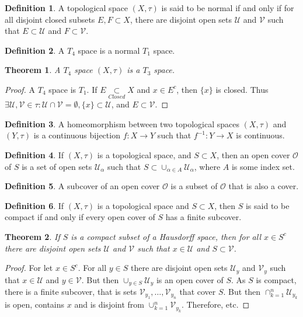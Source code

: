 \documentclass[oneside]{book}
\newtheorem{theorem}{Theorem}[section]
\theoremstyle{definition}
\newtheorem{definition}{Definition}[section]
\begin{document}
\begin{definition}
A topological space $(X,\tau)$ is said to be normal if and only if for all disjoint closed subsets $E,F\subset X$, there are disjoint open sets $\mathcal{U}$ and $\mathcal{V}$ such that $E\subset \mathcal{U}$ and $F\subset \mathcal{V}$.
\end{definition}

\begin{definition}
A $T_4$ space is a normal $T_1$ space.
\end{definition}

\begin{theorem}
A $T_4$ space $(X,\tau)$ is a $T_3$ space.
\end{theorem}
\begin{proof}
A $T_4$ space is $T_1$. If $E\underset{Closed}\subset X$ and $x\in E^c$, then $\{x\}$ is closed. Thus $\exists \mathcal{U},\mathcal{V}\in\tau: \mathcal{U}\cap\mathcal{V}=\emptyset, \{x\}\subset \mathcal{U}$, and $E\subset \mathcal{V}$.
\end{proof}

\begin{definition}
A homeomorphism between two topological spaces $(X,\tau)$ and $(Y,\tau)$ is a continuous bijection $f:X\rightarrow Y$ such that $f^{-1}:Y\rightarrow X$ is continuous.
\end{definition}

\begin{definition}
If $(X,\tau)$ is a topological space, and $S\subset X$, then an open cover $\mathcal{O}$ of $S$ is a set of open sets $\mathcal{U}_{\alpha}$ such that $S\subset \cup_{\alpha\in A} \mathcal{U}_{\alpha}$, where $A$ is some index set.
\end{definition}

\begin{definition}
A subcover of an open cover $\mathcal{O}$ is a subset of $\mathcal{O}$ that is also a cover.
\end{definition}

\begin{definition}
If $(X,\tau)$ is a topological space and $S\subset X$, then $S$ is said to be compact if and only if every open cover of $S$ has a finite subcover.
\end{definition}

\begin{theorem}
If $S$ is a compact subset of a Hausdorff space, then for all $x\in S^c$ there are disjoint open sets $\mathcal{U}$ and $\mathcal{V}$ such that $x\in \mathcal{U}$ and $S\subset \mathcal{V}$.
\end{theorem}
\begin{proof}
For let $x\in S^c$. For all $y\in S$ there are disjoint open sets $\mathcal{U}_y$ and $\mathcal{V}_y$ such that $x\in \mathcal{U}$ and $y\in \mathcal{V}$. But then $\cup_{y\in S} \mathcal{U}_y$ is an open cover of $S$. As $S$ is compact, there is a finite subcover, that is sets $\mathcal{V}_{y_1},\hdots, \mathcal{V}_{y_n}$ that cover $S$. But then $\cap_{k=1}^{n} \mathcal{U}_{y_k}$ is open, contains $x$ and is disjoint from $\cup_{k=1}^{n} \mathcal{V}_{y_k}$. Therefore, etc.
\end{proof}
\end{document}
